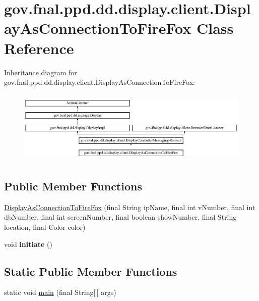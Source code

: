 \hypertarget{classgov_1_1fnal_1_1ppd_1_1dd_1_1display_1_1client_1_1DisplayAsConnectionToFireFox}{\section{gov.\-fnal.\-ppd.\-dd.\-display.\-client.\-Display\-As\-Connection\-To\-Fire\-Fox Class Reference}
\label{classgov_1_1fnal_1_1ppd_1_1dd_1_1display_1_1client_1_1DisplayAsConnectionToFireFox}
}
Inheritance diagram for gov.\-fnal.\-ppd.\-dd.\-display.\-client.\-Display\-As\-Connection\-To\-Fire\-Fox\-:\begin{figure}[H]
\begin{center}
\leavevmode
\includegraphics[height=3.526448cm]{classgov_1_1fnal_1_1ppd_1_1dd_1_1display_1_1client_1_1DisplayAsConnectionToFireFox}
\end{center}
\end{figure}
\subsection*{Public Member Functions}
\begin{DoxyCompactItemize}
\item 
\hyperlink{classgov_1_1fnal_1_1ppd_1_1dd_1_1display_1_1client_1_1DisplayAsConnectionToFireFox_a838142e5d383cb29508d7dcf52856726}{Display\-As\-Connection\-To\-Fire\-Fox} (final String ip\-Name, final int v\-Number, final int db\-Number, final int screen\-Number, final boolean show\-Number, final String location, final Color color)
\item 
\hypertarget{classgov_1_1fnal_1_1ppd_1_1dd_1_1display_1_1client_1_1DisplayAsConnectionToFireFox_abf0318b6c6466d7d54d19d627ef42f8a}{void {\bfseries initiate} ()}\label{classgov_1_1fnal_1_1ppd_1_1dd_1_1display_1_1client_1_1DisplayAsConnectionToFireFox_abf0318b6c6466d7d54d19d627ef42f8a}

\end{DoxyCompactItemize}
\subsection*{Static Public Member Functions}
\begin{DoxyCompactItemize}
\item 
static void \hyperlink{classgov_1_1fnal_1_1ppd_1_1dd_1_1display_1_1client_1_1DisplayAsConnectionToFireFox_a94f97e090bb1354513a78f28bd744390}{main} (final String\mbox{[}$\,$\mbox{]} args)
\end{DoxyCompactItemize}

